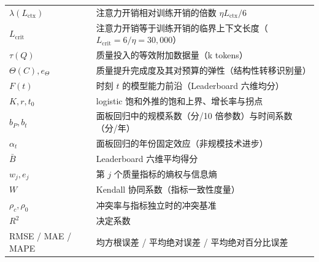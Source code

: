 \begin{longtable}{>{\centering\arraybackslash}p{}>{\centering\arraybackslash}p{}}
  $\lambda(L_{\text{ctx}})$ & 注意力开销相对训练开销的倍数 $\eta L_{\text{ctx}}/6$ \\
  $L_{\text{crit}}$ & 注意力开销等于训练开销的临界上下文长度（$L_{\text{crit}}=6/\eta=30{,}000$） \\
  $\tau(Q)$ & 质量投入的等效附加数据量（k tokens） \\
  $\Theta(C),e_\Theta$ & 质量提升完成度及其对预算的弹性（结构性转移识别量） \\
  $F(t)$ & 时刻 $t$ 的模型能力前沿（Leaderboard 六维均分） \\
  $K,r,t_0$ & logistic 饱和外推的饱和上界、增长率与拐点 \\
  $b_P,b_t$ & 面板回归中的规模系数（分/10 倍参数）与时间系数（分/年） \\
  $\alpha_t$ & 面板回归的年份固定效应（非规模技术进步） \\
  $\bar B$ & Leaderboard 六维平均得分 \\
  $w_j,e_j$ & 第 $j$ 个质量指标的熵权与信息熵 \\
  $W$ & Kendall 协同系数（指标一致性度量） \\
  $\rho_c,\rho_0$ & 冲突率与指标独立时的冲突基准 \\
  $R^2$ & 决定系数 \\
  RMSE / MAE / MAPE & 均方根误差 / 平均绝对误差 / 平均绝对百分比误差 \\
\end{longtable}
